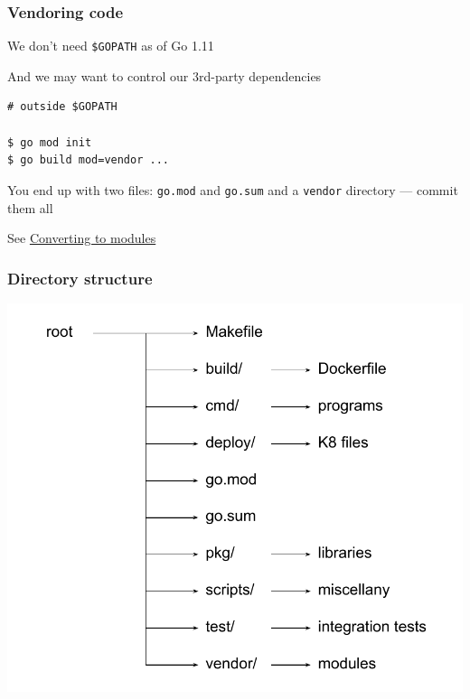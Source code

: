 \documentclass[handout,compress,t,11pt]{beamer}
\begin{document}
\begin{frame}[fragile]
    \frametitle{Vendoring code}
We don't need \verb|$GOPATH| as of Go 1.11 \par
\vspace{\baselineskip}
And we may want to control our 3rd-party dependencies \par
\begin{verbatim}
# outside $GOPATH

$ go mod init
$ go build mod=vendor ...
\end{verbatim}
You end up with two files: \verb|go.mod| and \verb|go.sum| and
a \verb|vendor| directory --- commit them all \par
\vspace{\baselineskip}
See \href{https://wingedpig.com/2019/05/09/notes-on-converting-a-repository-to-use-go-modules/}%
{Converting to modules}
\end{frame}

\begin{frame}[fragile]
    \frametitle{Directory structure}
    \vspace{-0.4\baselineskip}
\begin{center}
    \includegraphics[height=.9\textheight]{dir-structure.pdf}
\end{center}
\end{frame}
\end{document}
